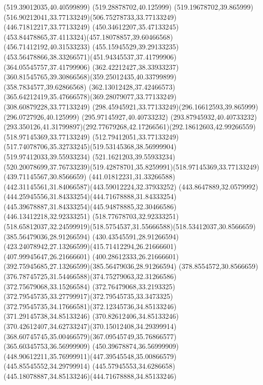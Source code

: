 {{		\lineto(519.39012035,40.40599899)
		\lineto(519.28878702,40.125999)
		\curveto(519.19678702,39.865999)(516.90212041,33.77133249)(506.75278733,33.77133249)
		\lineto(446.71812217,33.77133249)
		\curveto(450.34612207,35.47133245)(453.84478865,37.4113324)(457.18078857,39.60466568)
		\lineto(456.71412192,40.31533233)
		\curveto(455.15945529,39.29133235)(453.56478866,38.33266571)(451.94345537,37.41799906)
		\lineto(364.05545757,37.41799906)
		\curveto(362.42212427,38.33933237)(360.81545765,39.30866568)(359.25012435,40.33799899)
		\lineto(358.7834577,39.62866568)
		\curveto(362.13012428,37.42466573)(365.64212419,35.47666578)(369.28079077,33.77133249)
		\lineto(308.60879228,33.77133249)
		\curveto(298.45945921,33.77133249)(296.16612593,39.865999)(296.0727926,40.125999)
		\lineto(295.97145927,40.40733232)
		\lineto(293.87945932,40.40733232)
		\curveto(293.350126,41.31799897)(292.77679268,42.17266561)(292.18612603,42.99266559)
		\closepath
		\moveto(518.97145369,33.77133249)
		\lineto(512.79412051,33.77133249)
		\curveto(517.74078706,35.32733245)(519.53145368,38.56999904)(519.97412033,39.55933234)
		\lineto(521.1621203,39.55933234)
		\curveto(520.20078699,37.76733239)(519.42878701,35.8259991)(518.97145369,33.77133249)
		\moveto(439.71145567,30.8566659)
		\curveto(441.01812231,31.33266588)(442.31145561,31.84066587)(443.59012224,32.37933252)
		\curveto(443.8647889,32.0579992)(444.25945556,31.84333254)(444.71678888,31.84333254)
		\curveto(445.39678887,31.84333254)(445.94878885,32.30466586)(446.13412218,32.92333251)
		\lineto(518.77678703,32.92333251)
		\curveto(518.65812037,32.24599919)(518.5754537,31.55666588)(518.53412037,30.8566659)
		\closepath
		\moveto(385.56479036,28.91266594)
		\lineto(430.43545591,28.91266594)
		\curveto(423.24078942,27.13266599)(415.71412294,26.21666601)(407.99945647,26.21666601)
		\curveto(400.28612333,26.21666601)(392.75945685,27.13266599)(385.56479036,28.91266594)
		\moveto(378.8554572,30.8566659)
		\curveto(376.78745725,31.54466588)(374.75279063,32.31266586)(372.75679068,33.15266584)
		\curveto(372.76479068,33.2193325)(372.79545735,33.27799917)(372.79545735,33.3473325)
		\curveto(372.79545735,34.17666581)(372.12345736,34.85133246)(371.29145738,34.85133246)
		\curveto(370.82612406,34.85133246)(370.42612407,34.62733247)(370.15012408,34.29399914)
		\curveto(368.60745745,35.00466579)(367.09545749,35.76866577)(365.60345753,36.56999909)
		\lineto(450.39678874,36.56999909)
		\curveto(448.90612211,35.76999911)(447.39545548,35.00866579)(445.85545552,34.29799914)
		\curveto(445.57945553,34.6286658)(445.18078887,34.85133246)(444.71678888,34.85133246)
}}
